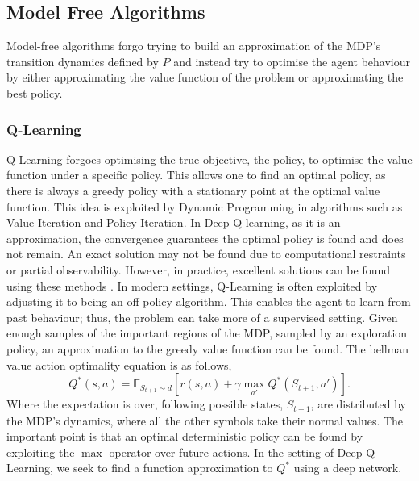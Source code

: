 \subsection{Model Free Algorithms}
Model-free algorithms forgo trying to build an approximation of the MDP's transition dynamics defined by $P$ and instead try to optimise the agent behaviour by either approximating the value function of the problem or approximating the best policy.
\subsubsection{Q-Learning}
Q-Learning forgoes optimising the true objective, the policy, to optimise the value function under a specific policy. This allows one to find an optimal policy, as there is always a greedy policy with a stationary point at the optimal value function. This idea is exploited by Dynamic Programming in algorithms such as Value Iteration\cite{bel} and Policy Iteration\cite{Howard1960DynamicPA}. In Deep Q learning, as it is an approximation, the convergence guarantees the optimal policy is found and does not remain. An exact solution may not be found due to computational restraints or partial observability. However, in practice, excellent solutions can be found using these methods \cite{DQN}. In modern settings, Q-Learning is often exploited by adjusting it to being an off-policy algorithm. This enables the agent to learn from past behaviour; thus, the problem can take more of a supervised setting. Given enough samples of the important regions of the MDP, sampled by an exploration policy, an approximation to the greedy value function can be found. The bellman value action optimality equation is as follows,
\begin{equation}
	Q^*(s, a) = \mathbb{E}_{S_{t+1} \sim d} \left[ r(s, a) + \gamma \max_{a'} Q^*(S_{t+1}, a') \right].
\end{equation}
Where the expectation is over, following possible states, $S_{t+1}$, are distributed by the MDP's dynamics, where all the other symbols take their normal values. The important point is that an optimal deterministic policy can be found by exploiting the $\max$ operator over future actions. In the setting of Deep Q Learning, we seek to find a function approximation to $Q^*$ using a deep network.

